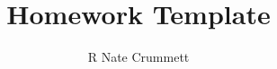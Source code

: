 \documentclass[12pt,answers]{exam}
\title{Homework Template}
\author{R Nate Crummett}
\begin{document}
\maketitle
\thispagestyle{empty}

\begin{questions}
	\question
\end{questions}
\end{document}
